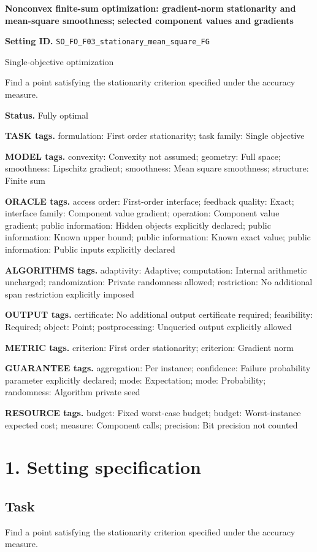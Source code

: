 \documentclass[10pt,a4paper]{article}
\begin{document}
\raggedright

{\LARGE\bfseries\sffamily\color{AtlasNavy} Nonconvex finite-sum optimization: gradient-norm stationarity and mean-square smoothness; selected component values and gradients\par}\vspace{5pt}
\textbf{Setting ID.} \texttt{SO\_\allowbreak{}FO\_\allowbreak{}F03\_\allowbreak{}stationary\_\allowbreak{}mean\_\allowbreak{}square\_\allowbreak{}FG}

Single-objective optimization

Find a point satisfying the stationarity criterion specified under the accuracy measure.

\textbf{Status.} Fully optimal

\textbf{TASK tags.} formulation: First order stationarity; task family: Single objective

\textbf{MODEL tags.} convexity: Convexity not assumed; geometry: Full space; smoothness: Lipschitz gradient; smoothness: Mean square smoothness; structure: Finite sum

\textbf{ORACLE tags.} access order: First-order interface; feedback quality: Exact; interface family: Component value gradient; operation: Component value gradient; public information: Hidden objects explicitly declared; public information: Known upper bound; public information: Known exact value; public information: Public inputs explicitly declared

\textbf{ALGORITHMS tags.} adaptivity: Adaptive; computation: Internal arithmetic uncharged; randomization: Private randomness allowed; restriction: No additional span restriction explicitly imposed

\textbf{OUTPUT tags.} certificate: No additional output certificate required; feasibility: Required; object: Point; postprocessing: Unqueried output explicitly allowed

\textbf{METRIC tags.} criterion: First order stationarity; criterion: Gradient norm

\textbf{GUARANTEE tags.} aggregation: Per instance; confidence: Failure probability parameter explicitly declared; mode: Expectation; mode: Probability; randomness: Algorithm private seed

\textbf{RESOURCE tags.} budget: Fixed worst-case budget; budget: Worst-instance expected cost; measure: Component calls; precision: Bit precision not counted

\section{1. Setting specification}
\subsection{Task}
Find a point satisfying the stationarity criterion specified under the accuracy measure.
\end{document}
